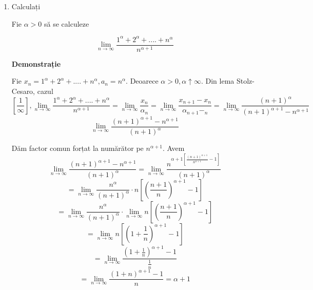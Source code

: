\documentclass[a4paper,12pt,oneside]{report}
\begin{document}
\begin{enumerate}
\item Calculați 

 Fie \(\alpha > 0\) să se calculeze 

\begin{displaymath}
  \lim_{n \to \infty }\frac{1^{\alpha }+2^{\alpha }+....+n^{\alpha }}{n^{\alpha +1}}
\end{displaymath}


\textbf{Demonstrație} 

Fie \(x_{n}=1^{\alpha }+2^{\alpha }+....+n^{\alpha },a_{n}= n^{\alpha }\). Deoarece \(\alpha > 0 , \alpha \uparrow \infty.\) Din lema Stolz-Cesaro, cazul 
\begin{displaymath}
  \left [ \frac{1}{\infty } \right ], 
\lim_{n \to \infty }\frac{1^{\alpha }+2^{\alpha }+....+n^{\alpha }}{n^{\alpha +1}}=\lim_{n \to \infty }\frac{x_{n}}{\alpha _{n}}= \lim_{n \to \infty } \frac{x_{n+1}-x_{n}}{\alpha _{n+1}-_{n}}=\lim_{n \to \infty } \frac{\left ( n+1 \right )^{\alpha }}{\left ( n+1 \right )^{\alpha+1} -n^{\alpha +1}}
\end{displaymath}
\begin{displaymath}
  \lim_{n \to \infty }\frac{\left ( n+1 \right )^{\alpha +1}-n^{\alpha +1}}{\left ( n+1 \right )^{\alpha }}
\end{displaymath}

Dăm factor comun forțat la numărător pe \(n^{\alpha +1}\). Avem 
\begin{displaymath}
  \lim_{n \to \infty }\frac{\left ( n+1 \right )^{\alpha +1}-n^{\alpha +1}}{\left ( n+1 \right )^{\alpha }} = \lim_{n \to \infty }\frac{n^{\alpha +1\left [ \frac{\left ( n+1 \right )^{\alpha +1}}{n^{\alpha +1}} -1\right ]}}{\left ( n+1 \right )^{\alpha }} 
\end{displaymath}
\begin{displaymath}
  = \lim_{n \to \infty }\frac{n^{\alpha }}{\left ( n+1 \right )^{\alpha }}\cdot n\left [ \left ( \frac{n+1}{n} \right )^{\alpha +1}-1 \right ]
\end{displaymath}
\begin{displaymath}
  =\lim_{n \to \infty }\frac{n^{\alpha }}{\left ( n+1 \right )^{\alpha }}\cdot \lim_{n \to \infty }n\left [ \left ( \frac{n+1}{n} \right )^{\alpha +1} -1\right ]
\end{displaymath}
\begin{displaymath}
  =\lim_{n \to \infty }n\left [ \left ( 1+\frac{1}{n} \right )^{\alpha +1}-1 \right ]
\end{displaymath}
\begin{displaymath}
  = \lim_{n \to \infty }\frac{\left ( 1+\frac{1}{n} \right )^{\alpha +1}-1}{\frac{1}{n}}
\end{displaymath}
\begin{displaymath}
  =\lim_{n \to \infty }\frac{\left ( 1+n \right )^{\alpha +1}-1}{n}= \alpha +1
\end{displaymath}


\end{enumerate}
\end{document}
